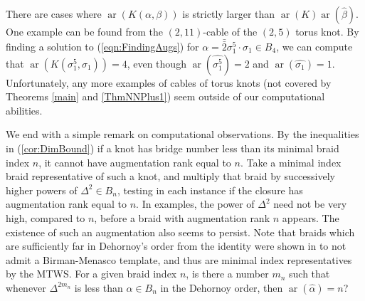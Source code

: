 \documentclass[11pt]{amsart}
\def\s{{\sigma}}
\def\ar{\operatorname{ar}}
\theoremstyle{definition}
\begin{document}
There are cases where $\ar(K(\alpha,\beta))$ is strictly larger than $\ar(K)\ar(\hat{\beta})$. One example can be found from the $(2,11)$-cable of the $(2,5)$ torus knot. By finding a solution to (\ref{eqn:FindingAugs}) for $\alpha = {\scriptstyle \bar{\bar{2}}}\s_1^5\cdot \s_1\in B_4$, we can compute that $\ar(K(\s_1^5,\s_1)) = 4$, even though $\ar(\hat{\s_1^5})=2$ and $\ar(\hat{\s_1})=1$. Unfortunately, any more examples of cables of torus knots (not covered by Theorems \ref{main} and \ref{ThmNNPlus1}) seem outside of our computational abilities.

We end with a simple remark on computational observations. By the inequalities in (\ref{cor:DimBound}) if a knot has bridge number less than its minimal braid index $n$, it cannot have augmentation rank equal to $n$. Take a minimal index braid representative of such a knot, and multiply that braid by successively higher powers of $\Delta^2\in B_n$, testing in each instance if the closure has augmentation rank equal to $n$. In examples, the power of $\Delta^2$ need not be very high, compared to $n$, before a braid with augmentation rank $n$ appears. The existence of such an augmentation also seems to persist. Note that braids which are sufficiently far in Dehornoy's order from the identity were shown in \cite{MN} to not admit a Birman-Menasco template, and thus are minimal index representatives by the MTWS. For a given braid index $n$, is there a number $m_n$ such that whenever $\Delta^{2m_n}$ is less than $\alpha\in B_n$ in the Dehornoy order, then $\ar(\hat{\alpha}) = n$?



\end{document}
